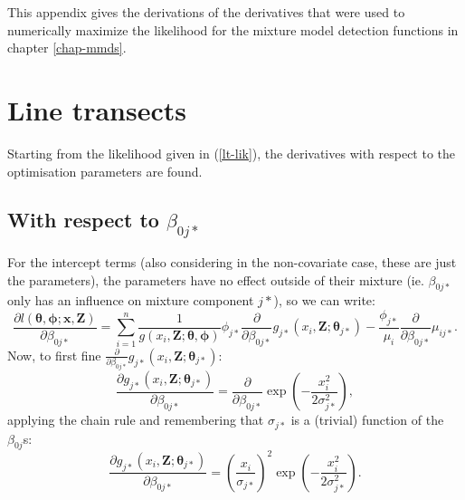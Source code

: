 \label{app-mixderivs}

This appendix gives the derivations of the derivatives that were used to numerically maximize the likelihood for the mixture model detection functions in chapter \ref{chap-mmds}.

\section{Line transects}

Starting from the likelihood given in (\ref{lt-lik}), the derivatives with respect to the optimisation parameters are found.

\subsection{With respect to $\beta_{0j*}$}
For the intercept terms (also considering in the non-covariate case, these are just the parameters), the parameters have no effect outside of their mixture (ie. $\beta_{0j*}$ only has an influence on mixture component $j*$), so we can write:
\begin{equation*}
\frac{\partial l\left (\bm{\theta},\bm{\phi}; \mathbf{x},\mathbf{Z}\right )}{\partial \beta_{0j*}} = \sum_{i=1}^n \frac{1}{g\left (x_i,\mathbf{Z}; \bm{\theta},\bm{\phi}\right )} \phi_{j*} \frac{\partial}{\partial \beta_{0j*}} g_{j*}\left (x_i,\mathbf{Z}; \bm{\theta}_{j*}\right )  - \frac{\phi_{j*}}{\mu_i}  \frac{\partial}{\partial \beta_{0j*}} \mu_{ij*}.
\end{equation*}
Now, to first fine $\frac{\partial}{\partial \beta_{0j*}} g_{j*}\left (x_i,\mathbf{Z}; \bm{\theta}_{j*}\right )$:
\begin{equation*}
\frac{\partial g_{j*}\left (x_i,\mathbf{Z}; \bm{\theta}_{j*}\right )}{\partial \beta_{0j*}} = \frac{\partial}{\partial \beta_{0j*}} \exp\left ( -\frac{x_i^2}{2\sigma_{j*}^2} \right ),
\end{equation*}
applying the chain rule and remembering that $\sigma_{j*}$ is a (trivial) function of the $\beta_{0j}$s:
\begin{equation*}
\frac{\partial g_{j*}\left (x_i,\mathbf{Z}; \bm{\theta}_{j*} \right )}{\partial \beta_{0j*}} = \left ( \frac{x_i}{\sigma_{j*}}\right )^2 \exp \left (-\frac{x_i^2}{2 \sigma_{j*}^2}\right ).
\end{equation*}

